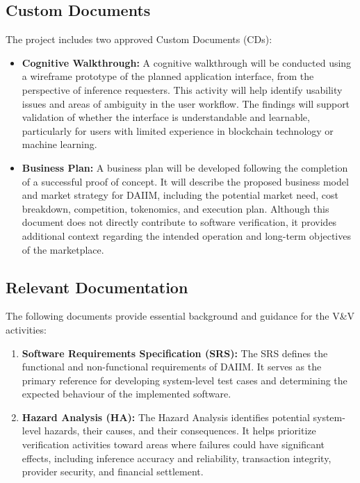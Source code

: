\documentclass[12pt]{article}
\begin{document}
\subsection{Custom Documents}

The project includes two approved Custom Documents (CDs):

\begin{itemize}
    \item \textbf{Cognitive Walkthrough:} A cognitive walkthrough will be conducted using a wireframe prototype of the planned application interface, from the perspective of inference requesters. This activity will help identify usability issues and areas of ambiguity in the user workflow. The findings will support validation of whether the interface is understandable and learnable, particularly for users with limited experience in blockchain technology or machine learning.

    \item \textbf{Business Plan:} A business plan will be developed following the completion of a successful proof of concept. It will describe the proposed business model and market strategy for DAIIM, including the potential market need, cost breakdown, competition, tokenomics, and execution plan. Although this document does not directly contribute to software verification, it provides additional context regarding the intended operation and long-term objectives of the marketplace.
\end{itemize}

\subsection{Relevant Documentation}

The following documents provide essential background and guidance for the V\&V activities:

\begin{enumerate}
    \item \textbf{Software Requirements Specification (SRS):} The SRS defines the functional and non-functional requirements of DAIIM. It serves as the primary reference for developing system-level test cases and determining the expected behaviour of the implemented software.

    \item \textbf{Hazard Analysis (HA):} The Hazard Analysis identifies potential system-level hazards, their causes, and their consequences. It helps prioritize verification activities toward areas where failures could have significant effects, including inference accuracy and reliability, transaction integrity, provider security, and financial settlement.
\end{enumerate}
\end{document}
